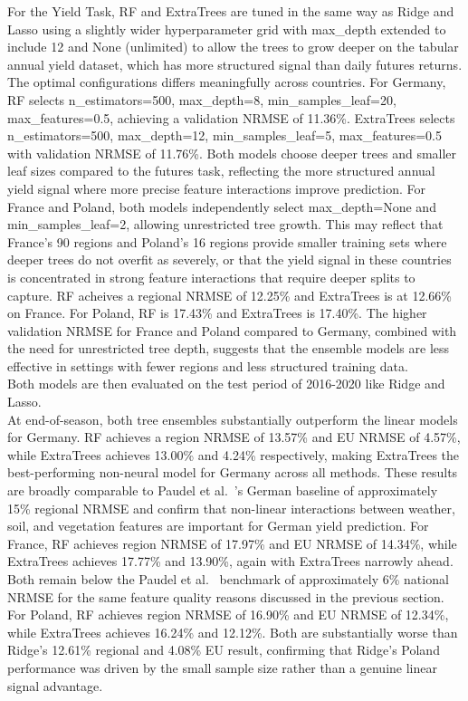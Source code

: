 \documentclass[pdflatex,sn-mathphys-num, oneside, 11pt]{sn-jnl}%
\theoremstyle{thmstyleone}%
\theoremstyle{thmstyletwo}%
\theoremstyle{thmstylethree}%
\begin{document}
For the Yield Task, RF and ExtraTrees are tuned in the same way as Ridge and Lasso using a slightly wider hyperparameter grid with max\_depth extended to include 12 and None (unlimited) to allow the trees to grow deeper on the tabular annual yield dataset, which has more structured signal than daily futures returns.\\

The optimal configurations differs meaningfully across countries. For Germany, RF selects n\_estimators=500, max\_depth=8, min\_samples\_leaf=20, max\_features=0.5, achieving a validation NRMSE of 11.36\%. ExtraTrees selects n\_estimators=500, max\_depth=12, min\_samples\_leaf=5, max\_features=0.5 with validation NRMSE of 11.76\%. Both models choose deeper trees and smaller leaf sizes compared to the futures task, reflecting the more structured annual yield signal where more precise feature interactions improve prediction. For France and Poland, both models independently select max\_depth=None and min\_samples\_leaf=2, allowing unrestricted tree growth. This may reflect that France's 90 regions and Poland's 16 regions provide smaller training sets where deeper trees do not overfit as severely, or that the yield signal in these countries is concentrated in strong feature interactions that require deeper splits to capture. RF acheives a regional NRMSE of 12.25\% and ExtraTrees is at 12.66\% on France. For Poland, RF is 17.43\% and ExtraTrees is 17.40\%. The higher validation NRMSE for France and Poland compared to Germany, combined with the need for unrestricted tree depth, suggests that the ensemble models are less effective in settings with fewer regions and less structured training data.\\

Both models are then evaluated on the test period of 2016-2020 like Ridge and Lasso.\\

At end-of-season, both tree ensembles substantially outperform the linear models for Germany. RF achieves a region NRMSE of 13.57\% and EU NRMSE of 4.57\%, while ExtraTrees achieves 13.00\% and 4.24\% respectively, making ExtraTrees the best-performing non-neural model for Germany across all methods. These results are broadly comparable to Paudel et al.~\cite{bib16}'s German baseline of approximately 15\% regional NRMSE and confirm that non-linear interactions between weather, soil, and vegetation features are important for German yield prediction. For France, RF achieves region NRMSE of 17.97\% and EU NRMSE of 14.34\%, while ExtraTrees achieves 17.77\% and 13.90\%, again with ExtraTrees narrowly ahead. Both remain below the Paudel et al.~\cite{bib16} benchmark of approximately 6\% national NRMSE for the same feature quality reasons discussed in the previous section. For Poland, RF achieves region NRMSE of 16.90\% and EU NRMSE of 12.34\%, while ExtraTrees achieves 16.24\% and 12.12\%. Both are substantially worse than Ridge's 12.61\% regional and 4.08\% EU result, confirming that Ridge's Poland performance was driven by the small sample size rather than a genuine linear signal advantage.\\
\end{document}
